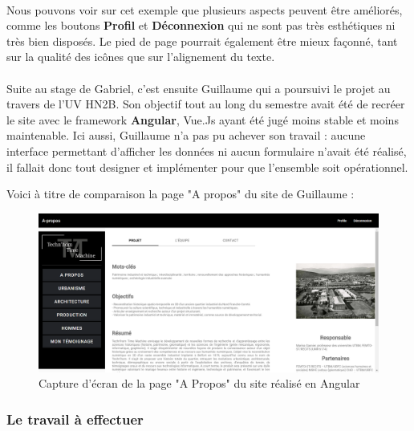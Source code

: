 \paragraph{} \hspace{10mm}
Nous pouvons voir sur cet exemple que plusieurs aspects peuvent être améliorés, comme les boutons \textbf{Profil} et \textbf{Déconnexion} qui ne sont pas très esthétiques ni très bien disposés. Le pied de page pourrait également être mieux façonné, tant sur la qualité des icônes que sur l'alignement du texte.

\paragraph{} \hspace{10mm}
Suite au stage de Gabriel, c'est ensuite Guillaume qui a poursuivi le projet au travers de l'UV HN2B. Son objectif tout au long du semestre avait été de recréer le site avec le framework \textbf{Angular}, Vue.Js ayant été jugé moins stable et moins maintenable. Ici aussi, Guillaume n'a pas pu achever son travail : aucune interface permettant d'afficher les données ni aucun formulaire n'avait été réalisé, il fallait donc tout designer et implémenter pour que l'ensemble soit opérationnel.

Voici à titre de comparaison la page "A propos" du site de Guillaume : 
\begin{figure} [H]
    \centering
    \includegraphics[width=1\textwidth]{assets/web/screen_main_angular.png}
    \caption{Capture d'écran de la page "A Propos" du site réalisé en Angular}
    \label{fig:screenMainAngular}
\end{figure}

\subsubsection{Le travail à effectuer}
